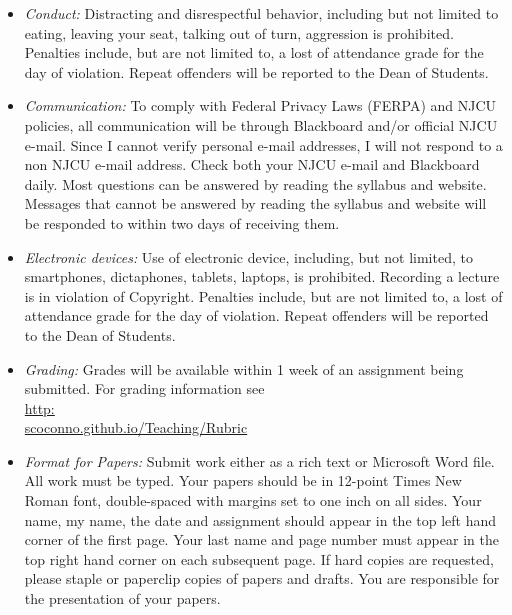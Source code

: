\documentclass[11pt,article,oneside]{memoir}
\begin{document}
\begin{itemize}
{\begin{itemize}
 

\item \textit{Conduct:} Distracting and disrespectful behavior, including but not limited to eating, leaving your seat, talking out of turn, aggression is prohibited. Penalties include, but are not limited to, a lost of attendance grade for the day of violation. Repeat offenders will be reported to the Dean of Students. 


\item \textit{Communication:} To comply with Federal Privacy Laws (FERPA) and NJCU policies, all communication will be through Blackboard and/or official NJCU e-mail. Since I cannot verify personal e-mail addresses,  I will not respond to a non NJCU e-mail address. Check both your NJCU e-mail and Blackboard daily. Most questions can be answered by reading the syllabus and website. Messages that cannot be answered by reading the syllabus and website will be responded to within two days of receiving them. 

\item \textit{Electronic devices:} Use of electronic device, including, but not limited, to smartphones, dictaphones, tablets, laptops, is prohibited. Recording a lecture is in violation of Copyright. Penalties include, but are not limited to, a lost of attendance grade for the day of violation. Repeat offenders will be reported to the Dean of Students.

\item \textit{Grading:} Grades will be available within 1 week of an assignment being submitted. For grading information see\\ \href{http://scoconno.github.io/Teaching/Rubric.}{http:\\scoconno.github.io/Teaching/Rubric}

\item \textit{Format for Papers:} Submit work either as a rich text or Microsoft Word file. All work must be typed. Your papers should be in 12-point Times New Roman font, double-spaced with margins set to one inch on all sides. Your name, my name, the date and assignment should appear in the top left hand corner of the first page. Your last name and page number must appear in the top right hand corner on each subsequent page. If hard copies are requested, please staple or paperclip copies of papers and drafts. You are responsible for the presentation of your papers.


\end{itemize}}
\end{itemize}
\end{document}
